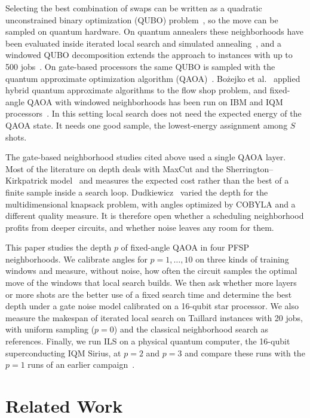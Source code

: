 \documentclass[runningheads]{llncs}
\begin{document}
Selecting the best combination of swaps can be written as a quadratic
unconstrained binary optimization (QUBO) problem~\cite{lucas2014ising}, so
the move can be sampled on quantum hardware. On quantum annealers these neighborhoods have been evaluated inside
iterated local search and simulated annealing~\cite{wojewodzki2026bpasts},
and a windowed QUBO decomposition extends the approach to instances with up
to 500 jobs~\cite{wojewodzki2026windowed}. On gate-based processors the same
QUBO is sampled with the quantum approximate optimization algorithm
(QAOA)~\cite{farhi2014qaoa}. Bo\.{z}ejko et
al.~\cite{bozejko2024cinti} applied hybrid quantum approximate algorithms to
the flow shop problem, and fixed-angle QAOA with windowed neighborhoods has
been run on IBM and IQM processors~\cite{wojewodzki2026gcmm,wojewodzki2026aciids}.
In this setting local search does not need the expected energy of the QAOA
state. It needs one good sample, the lowest-energy assignment among $S$
shots.

The gate-based neighborhood studies cited above used a single QAOA layer.
Most of the literature on depth deals with MaxCut and the Sherrington--Kirkpatrick
model~\cite{zhou2020,basso2022,wurtz2021fixed} and measures the expected cost
rather than the best of a finite sample inside a search loop.
Dudkiewicz~\cite{dudkiewicz2026depth} varied the depth for the
multidimensional knapsack problem, with angles optimized by COBYLA and a
different quality measure. It is therefore open whether a scheduling
neighborhood profits from deeper circuits, and whether noise leaves any room
for them.

This paper studies the depth $p$ of fixed-angle QAOA in four PFSP
neighborhoods. We calibrate angles for $p = 1, \dots, 10$ on three kinds of
training windows and measure, without noise, how often the circuit samples
the optimal move of the windows that local search builds. We then ask whether
more layers or more shots are the better use of a fixed search time and determine
the best depth under a gate noise model calibrated on a 16-qubit star
processor. We also measure the makespan of iterated
local search on Taillard instances with 20 jobs, with uniform sampling
($p = 0$) and the classical neighborhood search as references. Finally, we run ILS on a physical quantum computer, the 16-qubit
superconducting IQM Sirius, at $p = 2$ and $p = 3$ and compare these
runs with the $p = 1$ runs of an earlier campaign~\cite{wojewodzki2026aciids}.

\section{Related Work}
\end{document}
